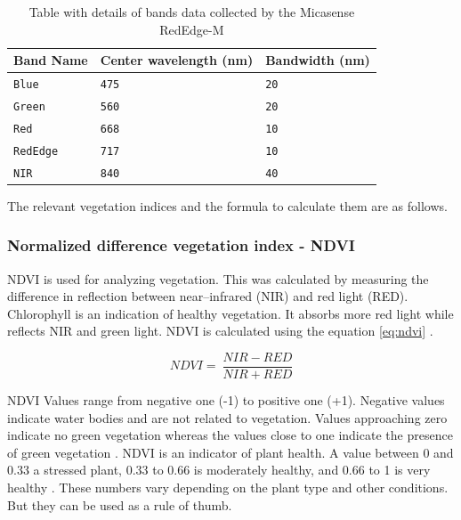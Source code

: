 \documentclass[sigconf, nonacm, natbib, screen, balance=False]{acmart}
\begin{document}
\begin{table}[h!]
  \caption{Table with details of bands data collected by the Micasense RedEdge-M \citep{RedEdgeM:online, lied}}
  \label{tab:bands}
  \begin{tabular}{lll}
    \hline
    Band Name & Center wavelength (nm) & Bandwidth (nm) \\\hline
    \verb!Blue! & \verb!475! & \verb!20! \\
    \verb!Green! & \verb!560! & \verb!20! \\
    \verb!Red! & \verb!668! & \verb!10! \\
    \verb!RedEdge! & \verb!717! & \verb!10! \\
    \verb!NIR! & \verb!840! & \verb!40! \\

  \end{tabular}
\end{table}






The relevant vegetation indices and the formula to calculate them are as follows.


\subsubsection{Normalized difference vegetation index - NDVI}\label{sec:ndvi}

NDVI is used for analyzing vegetation. This was calculated by measuring the difference in reflection between near–infrared (NIR) and red light (RED).  Chlorophyll is an indication of healthy vegetation. It absorbs more red light while reflects NIR and green light. NDVI is calculated using the equation \ref{eq:ndvi} \citep{rouse1974monitoring}.

\begin{equation}
  \label{eq:ndvi}
NDVI=\ \frac{NIR-RED}{NIR+RED}
\end{equation}

NDVI Values range from negative one (-1) to positive one (+1). Negative values indicate water bodies and are not related to vegetation. Values approaching zero indicate no green vegetation whereas the values close to one indicate the presence of green vegetation \citep{NDVI72:online}. NDVI is an indicator of plant health.  A value between 0 and 0.33 a stressed plant, 0.33 to 0.66 is moderately healthy, and 0.66 to 1 is very healthy \citep{NDVIPlan50:online}. These numbers vary depending on the plant type and other conditions. But they can be used as a rule of thumb.
\end{document}
